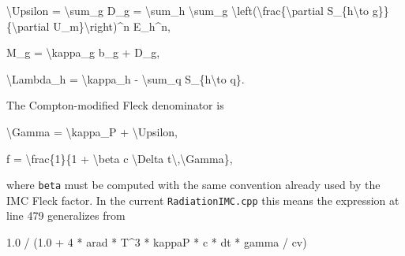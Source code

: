 \documentclass[
]{article}
\newenvironment{Shaded}{}{}
\newcommand{\DecValTok}[1]{\textcolor[rgb]{0.25,0.63,0.44}{#1}}
\newcommand{\FloatTok}[1]{\textcolor[rgb]{0.25,0.63,0.44}{#1}}
\newcommand{\NormalTok}[1]{#1}
\newcommand{\OperatorTok}[1]{\textcolor[rgb]{0.40,0.40,0.40}{#1}}
\begin{document}
\begin{Shaded}
\begin{Highlighting}[]
\NormalTok{\textbackslash{}Upsilon = \textbackslash{}sum\_g D\_g}
\NormalTok{          = \textbackslash{}sum\_h \textbackslash{}sum\_g \textbackslash{}left(\textbackslash{}frac\{\textbackslash{}partial S\_\{h\textbackslash{}to g\}\}\{\textbackslash{}partial U\_m\}\textbackslash{}right)\^{}n E\_h\^{}n,}
\end{Highlighting}
\end{Shaded}

\begin{Shaded}
\begin{Highlighting}[]
\NormalTok{M\_g = \textbackslash{}kappa\_g b\_g + D\_g,}
\end{Highlighting}
\end{Shaded}

\begin{Shaded}
\begin{Highlighting}[]
\NormalTok{\textbackslash{}Lambda\_h = \textbackslash{}kappa\_h {-} \textbackslash{}sum\_q S\_\{h\textbackslash{}to q\}.}
\end{Highlighting}
\end{Shaded}

The Compton-modified Fleck denominator is

\begin{Shaded}
\begin{Highlighting}[]
\NormalTok{\textbackslash{}Gamma = \textbackslash{}kappa\_P + \textbackslash{}Upsilon,}
\end{Highlighting}
\end{Shaded}

\begin{Shaded}
\begin{Highlighting}[]
\NormalTok{f = \textbackslash{}frac\{1\}\{1 + \textbackslash{}beta c \textbackslash{}Delta t\textbackslash{},\textbackslash{}Gamma\},}
\end{Highlighting}
\end{Shaded}

where \texttt{beta} must be computed with the same convention already
used by the IMC Fleck factor. In the current \texttt{RadiationIMC.cpp}
this means the expression at line 479 generalizes from

\begin{Shaded}
\begin{Highlighting}[]
\FloatTok{1.0} \OperatorTok{/} \OperatorTok{(}\FloatTok{1.0} \OperatorTok{+} \DecValTok{4} \OperatorTok{*}\NormalTok{ arad }\OperatorTok{*}\NormalTok{ T}\OperatorTok{\^{}}\DecValTok{3} \OperatorTok{*}\NormalTok{ kappaP }\OperatorTok{*}\NormalTok{ c }\OperatorTok{*}\NormalTok{ dt }\OperatorTok{*}\NormalTok{ gamma }\OperatorTok{/}\NormalTok{ cv}\OperatorTok{)}
\end{Highlighting}
\end{Shaded}
\end{document}
